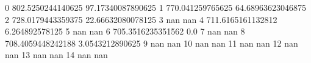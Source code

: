 0 802.5250244140625 97.17340087890625
1 770.041259765625 64.68963623046875
2 728.0179443359375 22.66632080078125
3 nan nan
4 711.6165161132812 6.264892578125
5 nan nan
6 705.3516235351562 0.0
7 nan nan
8 708.4059448242188 3.0543212890625
9 nan nan
10 nan nan
11 nan nan
12 nan nan
13 nan nan
14 nan nan
